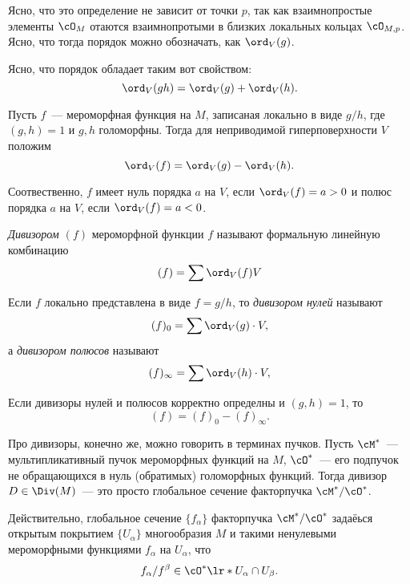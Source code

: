 	\begin{remark}
		Ясно, что это определение не зависит от точки $p$, так как взаимнопростые элементы $\cO_M$ отаются взаимнопротыми в близких локальных кольцах $\cO_{M, p}$. Ясно, что тогда порядок можно обозначать, как $\ord_{V}(g)$.
	\end{remark}

	Ясно, что порядок обладает таким вот свойством: 
	\[
		\ord_{V}(gh) = \ord_{V}(g) + \ord_{V}(h).
	\]

	\begin{definition} 
		Пусть $f$~--- мероморфная функция на $M$, записаная локально в виде $g/h$, где $(g, h) = 1$ и $g, h$ голоморфны. Тогда для неприводимой гиперповерхности $V$ положим 
		\[
			\ord_{V}(f) = \ord_{V}(g) - \ord_{V}(h).
		\]
	\end{definition}

	\begin{remark}
		Соотвественно, $f$ имеет нуль порядка $a$ на $V$, если $\ord_{V}(f) = a > 0$  и полюс порядка $a$ на $V$, если $\ord_{V}(f) = a < 0$.
	\end{remark}

	\begin{definition} 
		\emph{Дивизором $(f)$} мероморфной функции $f$ называют  формальную линейную комбинацию 
		\[
			(f) = \sum \ord_{V}(f) V
		\]

		Если $f$ локально представлена в виде $f = g/h$, то \emph{дивизором нулей} называют 
		\[
			(f)_{0} =\sum \ord_{V}(g) \cdot V,
		\]
		а \emph{дивизором полюсов} называют 
		\[
			(f)_{\infty}  =\sum \ord_{V}(h) \cdot V,
		\]
	\end{definition}

	\begin{remark}
		Если дивизоры нулей и полюсов корректно определны и $(g, h) = 1$, то 
		\[
			(f) = (f)_{0} - (f)_{\infty}.
		\]
	\end{remark}

	Про дивизоры, конечно же, можно говорить в терминах пучков. Пусть $\cM^{*}$~--- мультипликативный пучок мероморфных функций на $M$, $\cO^*$~--- его подпучок не обращающихся в нуль (обратимых) голоморфных функций. Тогда дивизор $D \in \Div(M)$~--- это просто глобальное сечение факторпучка $\cM^*/\cO^*$.

	Действительно, глобальное сечение $\{ f_{\alpha} \}$ факторпучка $\cM^{*}/\cO^{*}$ задаёься открытым покрытием $\{ U_{\alpha} \}$ многообразия $M$ и такими ненулевыми мероморфными функциями $f_{\alpha}$ на $U_{\alpha}$, что 
	\[
		f_{\alpha}/f^{\beta} \in \cO^{*}\lr*{U_{\alpha} \cap U_{\beta}}. 
	\]

